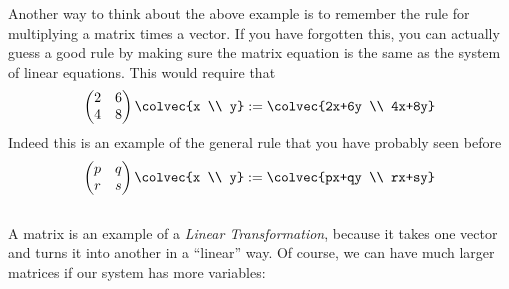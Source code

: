 Another way to think about the above example is to remember the rule for multiplying a matrix times a vector.
If you have forgotten this, you can actually  guess a good rule by making sure the matrix equation is the same as the system of linear equations.
This would require that
\[
 \begin{pmatrix}
      2     & 6 \\
      4     & 8
    \end{pmatrix}
  \colvec{x \\ y}
  :=   \colvec{2x+6y \\ 4x+8y}
\]
Indeed this is an example of
\hypertarget{ch1vecmult}{the general rule} that you have probably seen before
\begin{equation*}\label{2x2multiplication}
    \begin{pmatrix}
      p     & q  \\
      r      & s
    \end{pmatrix}
  \colvec{x \\ y}
  :=
  \colvec{px+qy \\ rx+sy}
\end{equation*}\\%
\noindent
A matrix is an example of a \emph{Linear Transformation}, because it takes one vector and turns it into another in a ``linear'' way.
Of course, we can have much larger matrices if our system has more variables:



